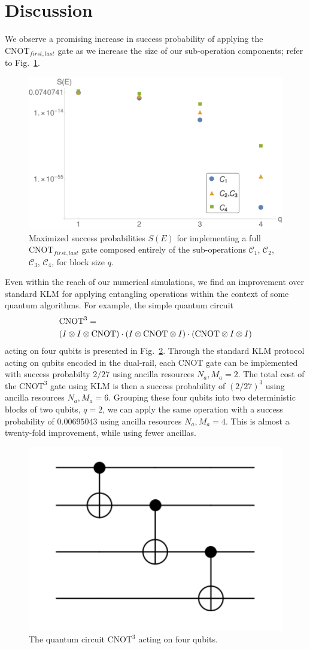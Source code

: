 \documentclass[aps,pra,twocolumn,showpacs,superscriptaddress,floatfix,10pt]{revtex4}
\begin{document}
 \section{Discussion}
 \label{Section Conclusion}
 We observe a promising increase in success probability of applying the $\mbox{CNOT}_{first,last}$ gate as we increase the size of our sub-operation components; refer to Fig.~\ref{Figure - Block Encoding Results}. 
 \begin{figure}[h]
  	\centering
  	\includegraphics[width=0.5 \textwidth]{./blockencodingresults.pdf}
  	\caption{Maximized success probabilities $S(E)$ for implementing a full $\mbox{CNOT}_{first,last}$ gate composed entirely of the sub-operations $\mathcal{C}_1$, $\mathcal{C}_2$, $\mathcal{C}_3$, $\mathcal{C}_4$, for block size $q$.}
  	\label{Figure - Block Encoding Results}
  \end{figure}
Even within the reach of our numerical simulations, we find an improvement over standard KLM for applying entangling operations within the context of some quantum algorithms. For example, the simple quantum circuit 
 \begin{eqnarray}
 \small & \mbox{CNOT}^3 = \\ \small \nonumber & (I \otimes I \otimes \mbox{CNOT}) \cdot (I \otimes  \mbox{CNOT} \otimes I) \cdot (\mbox{CNOT} \otimes I \otimes I)
 \end{eqnarray}
 acting on four qubits is presented in Fig.~\ref{Three CNOTs}. Through the standard KLM protocol acting on qubits encoded in the dual-rail, each CNOT gate can be implemented with success probabilty $2/27$ using ancilla resources $N_a,M_a=2$. The total cost of the $\mbox{CNOT}^3$ gate using KLM is then a success probability of $(2/27)^3$ using ancilla resources $ N_a,M_a = 6 $. Grouping these four qubits into two deterministic blocks of two qubits, $q=2$, we can apply the same operation with a success probability of $0.00695043$ using ancilla resources $ N_a,M_a=4 $. This is almost a twenty-fold improvement, while using fewer ancillas.
 \begin{figure}[ht]
 	\centering
 	\includegraphics[width=0.25 \textwidth]{./ThreeCNOTs.pdf}
 	\caption{The quantum circuit $\mbox{CNOT}^3$ acting on four qubits.}
 	\label{Three CNOTs}
 \end{figure}
\end{document}
